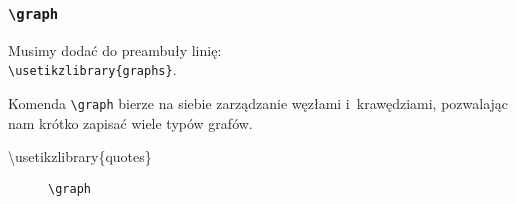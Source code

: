 \documentclass[10pt,t]{beamer}
\begin{document}
\begin{frame}
  \frametitle{\texttt{\textbackslash graph}}


  Musimy dodać do preambuły linię: \\
  \texttt{\textbackslash usetikzlibrary\{graphs\}}.

  Komenda \texttt{\textbackslash graph} bierze na siebie zarządzanie
  węzłami i~krawędziami, pozwalając nam krótko zapisać wiele typów
  grafów.

  \textbackslash usetikzlibrary\{quotes\}





  \begin{figure}

    \centering


    \begin{tikzpicture}











    \end{tikzpicture}


    \caption{\texttt{\textbackslash graph}}

  \end{figure}

\end{frame}
\end{document}
